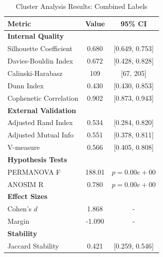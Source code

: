 
\begin{table}[h!]
\centering
\caption{Cluster Analysis Results: Combined Labels}
\label{tab:cluster_combined}
\begin{tabular}{lcc}
\toprule
Metric & Value & 95\% CI \\
\midrule
\multicolumn{3}{l}{\textbf{Internal Quality}} \\
Silhouette Coefficient & 0.680 & [0.649, 0.753] \\
Davies-Bouldin Index & 0.672 & [0.428, 0.828] \\
Calinski-Harabasz & 109 & [67, 205] \\
Dunn Index & 0.430 & [0.430, 0.853] \\
Cophenetic Correlation & 0.902 & [0.873, 0.943] \\
\midrule
\multicolumn{3}{l}{\textbf{External Validation}} \\
Adjusted Rand Index & 0.534 & [0.284, 0.820] \\
Adjusted Mutual Info & 0.551 & [0.378, 0.811] \\
V-measure & 0.566 & [0.405, 0.808] \\
\midrule
\multicolumn{3}{l}{\textbf{Hypothesis Tests}} \\
PERMANOVA F & 188.01 & $p = 0.00e+00$ \\
ANOSIM R & 0.780 & $p = 0.00e+00$ \\
\midrule
\multicolumn{3}{l}{\textbf{Effect Sizes}} \\
Cohen's $d$ & 1.868 & - \\
Margin & -1.090 & - \\
\midrule
\multicolumn{3}{l}{\textbf{Stability}} \\
Jaccard Stability & 0.421 & [0.259, 0.546] \\
\bottomrule
\end{tabular}
\end{table}
